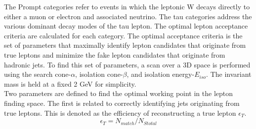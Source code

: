 The Prompt categories refer to events in which the leptonic W decays directly to either a muon or electron and associated neutrino. The tau categories address the various dominant decay modes of the tau lepton. The optimal lepton acceptance criteria are calculated for each category. The optimal acceptance criteria is the set of parameters that maximally identify lepton candidates that originate from true leptons and minimize the fake lepton candidates that originate from hadronic jets. To find this set of parameters, a scan over a 3D space is performed using the search cone-$\alpha$, isolation cone-$\beta$, and isolation energy-$E_{iso}$. The invariant mass is held at a fixed 2 GeV for simplicity.\\
Two parameters are defined to find the optimal working point in the lepton finding space. The first is related to correctly identifying jets originating from true leptons. This is denoted as the efficiency of reconstructing a true lepton $\epsilon_T$. 
\begin{equation}
\label{eq:et}
\epsilon_T = N_{match}/N_{Stotal}
\end{equation}
 
